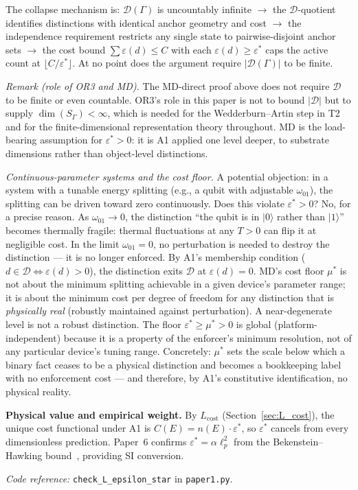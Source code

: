 \documentclass[11pt]{article}
\theoremstyle{remark}
\newcommand{\coderef}[2]{\smallskip\noindent\textit{Code reference:} \texttt{#1} in \texttt{#2}.}
\begin{document}
\begin{tcolorbox}[apfbox, title={$L_{\varepsilon^*}$ (Minimum Cost) --- Theorem}]
The collapse mechanism is: $\mathcal{D}(\Gamma)$ is uncountably infinite $\to$ the $\mathcal{D}$-quotient identifies distinctions with identical anchor geometry and cost $\to$ the independence requirement restricts any single state to pairwise-disjoint anchor sets $\to$ the cost bound $\sum \varepsilon(d) \le C$ with each $\varepsilon(d) \ge \varepsilon^*$ caps the active count at $\lfloor C/\varepsilon^* \rfloor$.  At no point does the argument require $|\mathcal{D}(\Gamma)|$ to be finite.

\smallskip\noindent\textit{Remark (role of OR3 and MD).}  The MD-direct proof above does not require $\mathcal{D}$ to be finite or even countable.  OR3's role in this paper is not to bound $|\mathcal{D}|$ but to supply $\dim(S_\Gamma) < \infty$, which is needed for the Wedderburn--Artin step in T2 and for the finite-dimensional representation theory throughout.  MD is the load-bearing assumption for $\varepsilon^* > 0$: it is A1 applied one level deeper, to substrate dimensions rather than object-level distinctions.

\smallskip\noindent\textit{Continuous-parameter systems and the cost floor.}  A potential objection: in a system with a tunable energy splitting (e.g., a qubit with adjustable $\omega_{01}$), the splitting can be driven toward zero continuously.  Does this violate $\varepsilon^* > 0$?  No, for a precise reason.  As $\omega_{01} \to 0$, the distinction ``the qubit is in $|0\rangle$ rather than $|1\rangle$'' becomes thermally fragile: thermal fluctuations at any $T > 0$ can flip it at negligible cost.  In the limit $\omega_{01} = 0$, no perturbation is needed to destroy the distinction --- it is no longer enforced.  By A1's membership condition ($d \in \mathcal{D} \Leftrightarrow \varepsilon(d) > 0$), the distinction exits $\mathcal{D}$ at $\varepsilon(d) = 0$.  MD's cost floor $\mu^*$ is not about the minimum splitting achievable in a given device's parameter range; it is about the minimum cost per degree of freedom for any distinction that is \emph{physically real} (robustly maintained against perturbation).  A near-degenerate level is not a robust distinction.  The floor $\varepsilon^* \ge \mu^* > 0$ is global (platform-independent) because it is a property of the enforcer's minimum resolution, not of any particular device's tuning range.  Concretely: $\mu^*$ sets the scale below which a binary fact ceases to be a physical distinction and becomes a bookkeeping label with no enforcement cost --- and therefore, by A1's constitutive identification, no physical reality.

\smallskip\noindent\textbf{Physical value and empirical weight.}  By $L_{\mathrm{cost}}$ (Section~\ref{sec:L_cost}), the unique cost functional under A1 is $C(E) = n(E) \cdot \varepsilon^*$, so $\varepsilon^*$ cancels from every dimensionless prediction.  Paper~6 confirms $\varepsilon^* = \alpha\ell_p^2$ from the Bekenstein--Hawking bound~\cite{Bekenstein1981}, providing SI conversion.

\coderef{check\_L\_epsilon\_star}{paper1.py}
\end{tcolorbox}
\end{document}
